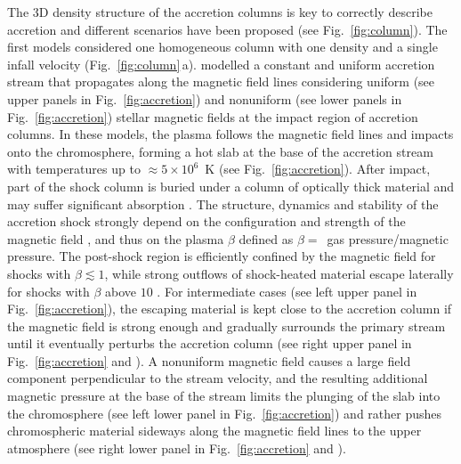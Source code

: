 The 3D density structure of the accretion columns is key to correctly describe accretion and 
different scenarios have been proposed (see Fig.~\ref{fig:column}). The first models considered one homogeneous column with one density and a single infall velocity (Fig.~\ref{fig:column}\,a). 
\citet{Orlando_2010, Orlando_2013} modelled a constant and uniform accretion stream that propagates along the magnetic field lines considering uniform  (see upper panels in Fig.~\ref{fig:accretion}) and nonuniform  (see lower panels in Fig.~\ref{fig:accretion}) stellar magnetic fields at the impact region of accretion columns. In these models, the plasma follows the magnetic field lines and impacts onto the chromosphere, forming a hot slab at the base of the accretion stream with temperatures up to $\approx 5\times10^6$~K (see Fig.~\ref{fig:accretion}). After impact, part of the shock column is buried under a column of optically thick material and may suffer significant absorption \cite{Orlando_2010,Orlando_2013}.
The structure, dynamics and stability of the accretion shock strongly depend on the configuration and strength of the magnetic field \cite{Orlando_2010}, and thus on the plasma $\beta$ defined as $\beta =$~gas pressure/magnetic pressure. 
The post-shock region is efficiently confined by the magnetic field for shocks with $\beta \lesssim 1$, while strong outflows of shock-heated material 
escape laterally for shocks with $\beta$ above $10$ \cite{Orlando_2010,Orlando_2013}. For intermediate cases (see left upper panel in Fig.~\ref{fig:accretion}), the escaping material is kept close to the accretion column 
if the magnetic field is strong enough and gradually surrounds the primary stream until it eventually perturbs the accretion column (see right upper panel in Fig.~\ref{fig:accretion} and \cite{Orlando_2010}). 
A nonuniform magnetic field causes a large field component perpendicular to the stream velocity, and the resulting additional magnetic pressure at the base of the stream limits the plunging of the slab into the chromosphere (see left lower panel in Fig.~\ref{fig:accretion}) and rather pushes chromospheric material sideways along the magnetic field lines to the upper atmosphere (see right lower panel in Fig.~\ref{fig:accretion} and \cite{Orlando_2013}). 

